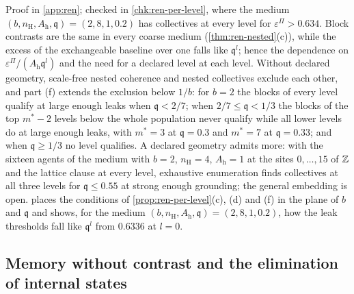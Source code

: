 Proof in \cref{app:ren}; checked in \cref{chk:ren-per-level}, where the medium $(b,n_{\mathrm H},A_{\mathrm h},\mathfrak q)=(2,8,1,0.2)$ has collectives at every level for $\varepsilon^\Pi>0.634$. Block contrasts are the same in every coarse medium (\cref{thm:ren-nested}(c)), while the excess of the exchangeable baseline over one falls like $\mathfrak q^l$; hence the dependence on $\varepsilon^\Pi/(A_{\mathrm h}\mathfrak q^l)$ and the need for a declared level at each level. Without declared geometry, scale-free nested coherence and nested collectives exclude each other, and part (f) extends the exclusion below $1/b$: for $b=2$ the blocks of every level qualify at large enough leaks when $\mathfrak q<2/7$; when $2/7\le\mathfrak q<1/3$ the blocks of the top $m^\ast-2$ levels below the whole population never qualify while all lower levels do at large enough leaks, with $m^\ast=3$ at $\mathfrak q=0.3$ and $m^\ast=7$ at $\mathfrak q=0.33$; and when $\mathfrak q\ge1/3$ no level qualifies. A declared geometry admits more: with the sixteen agents of the medium with $b=2$, $n_{\mathrm H}=4$, $A_{\mathrm h}=1$ at the sites $0,\dots,15$ of $\mathbb{Z}$ and the lattice clause at every level, exhaustive enumeration finds collectives at all three levels for $\mathfrak q\le0.55$ at strong enough grounding; the general embedding is open.  places the conditions of \cref{prop:ren-per-level}(c), (d) and (f) in the plane of $b$ and $\mathfrak q$ and shows, for the medium $(b,n_{\mathrm H},A_{\mathrm h},\mathfrak q)=(2,8,1,0.2)$, how the leak thresholds fall like $\mathfrak q^l$ from $0.6336$ at $l=0$.

\subsection{Memory without contrast and the elimination of internal states}\label{sup:ren-memory-without-contrast-and-the-eliminat}

